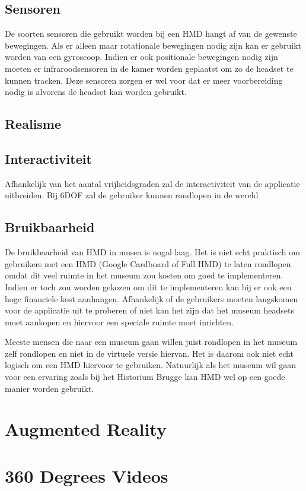 \subsection{Sensoren}
De soorten sensoren die gebruikt worden bij een HMD hangt af van de gewenste bewegingen. Als er alleen maar rotationale bewegingen nodig zijn kan er gebruikt worden van een gyroscoop. Indien er ook positionale bewegingen nodig zijn moeten er infraroodsensoren in de kamer worden geplaatst om zo de headset te kunnen tracken. Deze sensoren zorgen er wel voor dat er meer voorbereiding nodig is alvorens de headset kan worden gebruikt.
\subsection{Realisme}
\subsection{Interactiviteit}
Afhankelijk van het aantal vrijheidsgraden zal de interactiviteit van de applicatie uitbreiden. Bij 6DOF zal de gebruiker kunnen rondlopen in de wereld 
\subsection{Bruikbaarheid}
De bruikbaarheid van HMD in musea is nogal laag. Het is niet echt praktisch om gebruikers met een HMD (Google Cardboard of Full HMD) te laten rondlopen omdat dit veel ruimte in het museum zou kosten om goed te implementeren. Indien er toch zou worden gekozen om dit te implementeren kan bij er ook een hoge financiele kost aanhangen. Afhankelijk of de gebruikers moeten langskomen voor de applicatie uit te proberen of niet kan het zijn dat het museum headsets moet aankopen en hiervoor een speciale ruimte moet inrichten.

Meeste mensen die naar een museum gaan willen juist rondlopen in het museum zelf rondlopen en niet in de virtuele versie hiervan. Het is daarom ook niet echt logisch om een HMD hiervoor te gebruiken. Natuurlijk als het museum wil gaan voor een ervaring zoals bij het Historium Brugge kan HMD wel op een goede manier worden gebruikt.

\section{Augmented Reality} \label{sec:augmentedreality}
\section{360 Degrees Videos}
